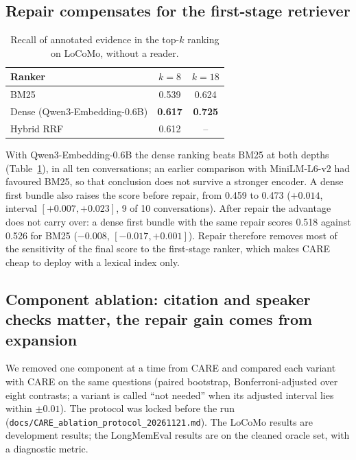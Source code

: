 \documentclass[10pt]{article}
\theoremstyle{plain}
\newcommand{\care}{\textsc{CARE}}
\begin{document}
\subsection{Repair compensates for the first-stage retriever}
\label{sec:retriever}

\begin{table}[t]
\centering
\caption{Recall of annotated evidence in the top-$k$ ranking on LoCoMo, without a reader.}
\label{tab:retrieval}
\small
\begin{tabular}{lcc}
\toprule
Ranker & $k{=}8$ & $k{=}18$ \\
\midrule
BM25 & 0.539 & 0.624 \\
Dense (Qwen3-Embedding-0.6B) & \textbf{0.617} & \textbf{0.725} \\
Hybrid RRF & 0.612 & -- \\
\bottomrule
\end{tabular}
\end{table}

With Qwen3-Embedding-0.6B the dense ranking beats BM25 at both depths (Table~\ref{tab:retrieval}), in all ten
conversations; an earlier comparison with MiniLM-L6-v2 had favoured BM25, so that conclusion does not survive a
stronger encoder. A dense first bundle also raises the score before repair, from 0.459 to 0.473 ($+0.014$, interval
$[+0.007,+0.023]$, 9 of 10 conversations). After repair the advantage does not carry over: a dense first bundle with
the same repair scores 0.518 against 0.526 for BM25 ($-0.008$, $[-0.017,+0.001]$). Repair therefore removes most of the
sensitivity of the final score to the first-stage ranker, which makes \care{} cheap to deploy with a lexical index only.

\subsection{Component ablation: citation and speaker checks matter, the repair gain comes from expansion}
\label{sec:ablation}

We removed one component at a time from \care{} and compared each variant with \care{} on the same questions (paired
bootstrap, Bonferroni-adjusted over eight contrasts; a variant is called ``not needed'' when its adjusted interval lies
within $\pm0.01$). The protocol was locked before the run (\texttt{docs/CARE\_ablation\_protocol\_20261121.md}). The
LoCoMo results are development results; the LongMemEval results are on the cleaned oracle set, with a diagnostic metric.
\end{document}

